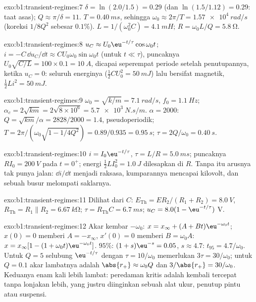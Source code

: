 \begin{solution}{exo:b1:transient-regimes:7}
$\delta = \ln(2.0/1.5) = 0.29$ (dan $\ln(1.5/1.12) = 0.29$: taat asas);
$Q \approx \pi/\delta = 11$. $T = \qty{0.40}{ms}$, sehingga $\omega_0 \approx
2\pi/T = \qty{1.57e4}{rad/s}$ (koreksi $1/8Q^2$ sebesar $0.1\%$).
$L = 1/(\omega_0^2 C) = \qty{4.1}{mH}$; $R = \omega_0 L/Q = \qty{5.8}{\ohm}$.
\end{solution}

\begin{solution}{exo:b1:transient-regimes:8}
$u_C \approx U_0\eu^{-t/\tau}\cos\omega_0 t$; $i = -C\,\dd u_C/\dd t
\approx CU_0\omega_0\sin\omega_0 t$ (untuk $t \ll \tau$), puncaknya $U_0\sqrt{C/L}
= 100 \times 0.1 = \qty{10}{A}$, dicapai seperempat periode setelah
penutupannya, ketika $u_C = 0$: seluruh energinya ($\tfrac12 CU_0^2 = \qty{50}{mJ}$)
lalu bersifat magnetik, $\tfrac12 Li^2 = \qty{50}{mJ}$.
\end{solution}

\begin{solution}{exo:b1:transient-regimes:9}
$\omega_0 = \sqrt{k/m} = \qty{7.1}{rad/s}$, $f_0 = \qty{1.1}{Hz}$;
$\alpha_c = 2\sqrt{km} = 2\sqrt{8\times10^6} = \qty{5.7e3}{N.s/m}$.
$\alpha = 2000$: $Q = \sqrt{km}/\alpha = 2828/2000 = 1.4$, pseudoperiodik;
$T = 2\pi/(\omega_0\sqrt{1 - 1/4Q^2}) = 0.89/0.935 = \qty{0.95}{s}$;
$\tau = 2Q/\omega_0 = \qty{0.40}{s}$.
\end{solution}

\begin{solution}{exo:b1:transient-regimes:10}
$i = I_0\eu^{-t/\tau}$, $\tau = L/R = \qty{5.0}{ms}$;  puncaknya
$RI_0 = \qty{200}{V}$ pada $t = 0^+$; energi $\tfrac12 LI_0^2 = \qty{1.0}{J}$
dilesapkan di $R$. Tanpa  itu arusnya tak punya jalan:
$\dd i/\dd t$ menjadi raksasa,  kumparannya mencapai kilovolt,
dan sebuah busur melompati saklarnya.
\end{solution}

\begin{solution}{exo:b1:transient-regimes:11}
Dilihat dari $C$: $E_{\mathrm{Th}} = ER_2/(R_1 + R_2) = \qty{8.0}{V}$,
$R_{\mathrm{Th}} = R_1 \parallel R_2 = \qty{6.67}{k\ohm}$; $\tau =
R_{\mathrm{Th}}C = \qty{6.7}{ms}$; $u_C = 8.0(1 - \eu^{-t/\tau})$ V.
\end{solution}

\begin{solution}{exo:b1:transient-regimes:12}
Akar kembar $-\omega_0$: $x = x_\infty + (A + Bt)\eu^{-\omega_0 t}$;
$x(0) = 0$ memberi $A = -x_\infty$, $x'(0) = 0$ memberi $B = \omega_0 A$:
$x = x_\infty[1 - (1 + \omega_0 t)\eu^{-\omega_0 t}]$. $95\%$:
$(1 + s)\eu^{-s} = 0.05$, $s \approx 4.7$: $t_{95} = 4.7/\omega_0$. Untuk
$Q = 5$ selubung $\eu^{-t/\tau}$ dengan $\tau = 10/\omega_0$ memerlukan
$3\tau = 30/\omega_0$; untuk $Q = 0.1$ akar lambatnya adalah $\abs{r_+} \approx
\omega_0 Q$ dan $3/\abs{r_+} = 30/\omega_0$. Keduanya enam kali lebih
lambat: peredaman kritis adalah kembali tercepat tanpa lonjakan lebih,
yang justru diinginkan sebuah alat ukur, penutup pintu atau suspensi.
\end{solution}

